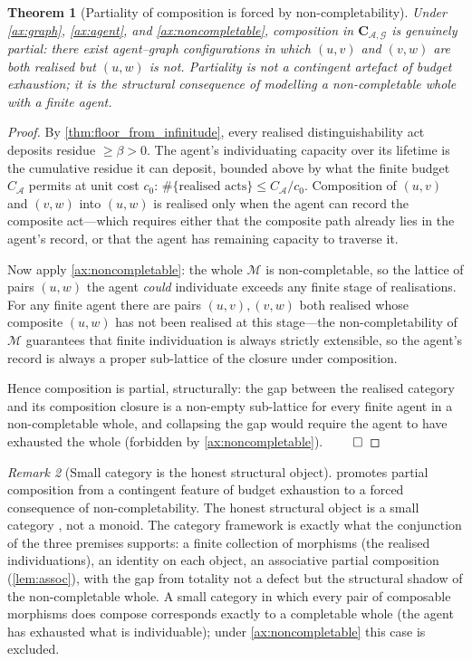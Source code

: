 \documentclass[11pt,twocolumn,a4paper]{article}
\theoremstyle{thmstyle}
\newtheorem{theorem}{Theorem}[section]
\theoremstyle{definition}
\theoremstyle{remark}
\newtheorem{remark}[theorem]{Remark}
\newcommand{\Graph}{\mathcal{G}}
\newcommand{\Agent}{\mathcal{A}}
\newcommand{\floor}{\beta}
\begin{document}
\begin{theorem}[Partiality of composition is forced by
non-completability]
\label{thm:partiality_forced}
Under \cref{ax:graph}, \cref{ax:agent}, and
\cref{ax:noncompletable}, composition in
$\mathbf{C}_{\Agent,\Graph}$ is genuinely partial: there exist
agent--graph configurations in which $(u, v)$ and $(v, w)$ are both
realised but $(u, w)$ is not. Partiality is not a contingent
artefact of budget exhaustion; it is the structural consequence of
modelling a non-completable whole with a finite agent.
\end{theorem}



\begin{proof}
By \cref{thm:floor_from_infinitude}, every realised
distinguishability act deposits residue $\geq \floor > 0$. The
agent's individuating capacity over its lifetime is the cumulative
residue it can deposit, bounded above by what the finite budget
$C_\Agent$ permits at unit cost $c_0$:
$\#\{\text{realised acts}\} \leq C_\Agent / c_0$.
Composition of $(u, v)$ and $(v, w)$ into $(u, w)$ is realised only
when the agent can record the composite act---which requires either
that the composite path already lies in the agent's record, or that
the agent has remaining capacity to traverse it.

Now apply \cref{ax:noncompletable}: the whole $\mathcal M$ is
non-completable, so the lattice of pairs $(u, w)$ the agent
\emph{could} individuate exceeds any finite stage of realisations.
For any finite agent there are pairs $(u, v), (v, w)$ both realised
whose composite $(u, w)$ has not been realised at this stage---the
non-completability of $\mathcal M$ guarantees that finite
individuation is always strictly extensible, so the agent's record
is always a proper sub-lattice of the closure under composition.

Hence composition is partial, structurally: the gap between the
realised category and its composition closure is a non-empty
sub-lattice for every finite agent in a non-completable whole, and
collapsing the gap would require the agent to have exhausted the
whole (forbidden by \cref{ax:noncompletable}). $\qed$
\end{proof}

\begin{remark}[Small category is the honest structural object]
\label{rem:why_category}
 promotes partial composition from a
contingent feature of budget exhaustion to a forced consequence of
non-completability. The honest structural object is a small
category \citep{maclane1998}, not a monoid. The category framework
is exactly what the conjunction of the three premises supports: a
finite collection of morphisms (the realised individuations), an
identity on each object, an associative partial composition
(\cref{lem:assoc}), with the gap from totality not a defect but the
structural shadow of the non-completable whole. A small category in
which every pair of composable morphisms does compose corresponds
exactly to a completable whole (the agent has exhausted what is
individuable); under \cref{ax:noncompletable} this case is
excluded.
\end{remark}
\end{document}
